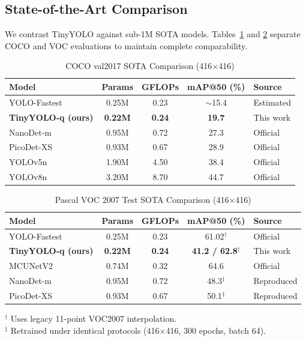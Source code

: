 \documentclass[journal]{IEEEtran}
\begin{document}
\subsection{State-of-the-Art Comparison}
We contrast TinyYOLO against sub-1M SOTA models. Tables~\ref{tab:sota_coco} and \ref{tab:sota_voc} separate COCO and VOC evaluations to maintain complete comparability.

\begin{table}[h]
\centering
\caption{COCO val2017 SOTA Comparison (416$\times$416)}
\label{tab:sota_coco}
\setlength{\tabcolsep}{4pt}
\begin{tabular}{lcccl}
\toprule
Model & Params & GFLOPs & mAP@50 (\%) & Source \\
\midrule
YOLO-Fastest \cite{wu2021yolofastest} & 0.25M & 0.23 & $\sim$15.4 & Estimated \\
\textbf{TinyYOLO-q (ours)} & \textbf{0.22M} & \textbf{0.24} & \textbf{19.7} & This work \\
NanoDet-m \cite{lyu2020nanodet} & 0.95M & 0.72 & 27.3 & Official \\
PicoDet-XS \cite{yu2021picodet} & 0.93M & 0.67 & 28.9 & Official \\
YOLOv5n \cite{jocher2020yolov5} & 1.90M & 4.50 & 38.4 & Official \\
YOLOv8n \cite{jocher2023yolov8} & 3.20M & 8.70 & 44.7 & Official \\
\bottomrule
\end{tabular}
\end{table}

\begin{table}[h]
\centering
\caption{Pascal VOC 2007 Test SOTA Comparison (416$\times$416)}
\label{tab:sota_voc}
\setlength{\tabcolsep}{4pt}
\begin{tabular}{lcccl}
\toprule
Model & Params & GFLOPs & mAP@50 (\%) & Source \\
\midrule
YOLO-Fastest \cite{wu2021yolofastest} & 0.25M & 0.23 & 61.02$^\dagger$ & Official \\
\textbf{TinyYOLO-q (ours)} & \textbf{0.22M} & \textbf{0.24} & \textbf{41.2 / 62.8$^\dagger$} & This work \\
MCUNetV2 \cite{lin2021mcunetv2} & 0.74M & 0.32 & 64.6 & Official \\
NanoDet-m \cite{lyu2020nanodet} & 0.95M & 0.72 & 48.3$^\ddagger$ & Reproduced \\
PicoDet-XS \cite{yu2021picodet} & 0.93M & 0.67 & 50.1$^\ddagger$ & Reproduced \\
\bottomrule
\end{tabular}
\vskip 2pt
\begin{flushleft}
\scriptsize $^\dagger$ Uses legacy 11-point VOC2007 interpolation.\\
$^\ddagger$ Retrained under identical protocols (416$\times$416, 300 epochs, batch 64).
\end{flushleft}
\end{table}
\end{document}
